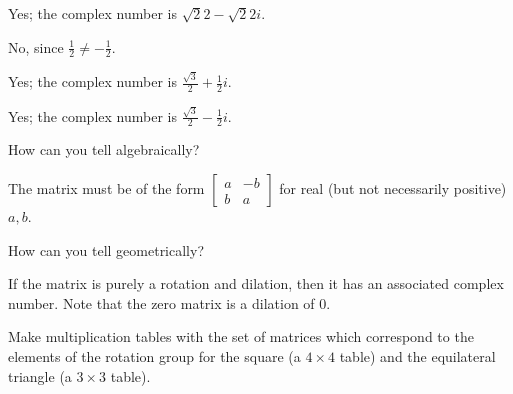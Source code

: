 \documentclass[../gatm_answers.tex]{subfiles}
\begin{document}
Yes; the complex number is $\sqrt{2}{2} - \sqrt{2}{2}i$.

\begin{iinner_problem}
\item {}
\end{iinner_problem}

No, since $\frac{1}{2} \neq -\frac{1}{2}$.

\begin{iinner_problem}
\item {}
\end{iinner_problem}

Yes; the complex number is $\frac{\sqrt{3}}{2} + \frac{1}{2}i$.

\begin{iinner_problem}
\item {}
\end{iinner_problem}

Yes; the complex number is $\frac{\sqrt{3}}{2} - \frac{1}{2}i$.

\begin{inner_problem}
\item How can you tell algebraically?
\end{inner_problem}

The matrix must be of the form $\begin{bmatrix} a & -b \\ b & a \end{bmatrix}$ for real (but not necessarily positive) $a,b$.

\begin{inner_problem}
\item How can you tell geometrically?
\end{inner_problem}

If the matrix is purely a rotation and dilation, then it has an associated complex number. Note that the zero matrix is a dilation of $0$.

\begin{outer_problem}
\item Make multiplication tables with the set of matrices which correspond to the elements of the rotation group for the square (a $4\times 4$ table) and the equilateral triangle (a $3\times 3$ table).
\end{outer_problem}
\end{document}
